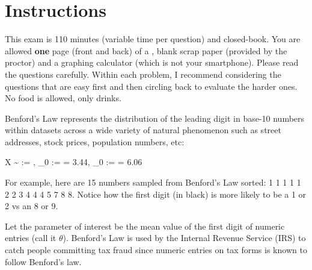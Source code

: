 \documentclass[12pt]{article}
\newcommand{\logbaseten}[1]{\text{log$_{10}$}\parens{#1}}
\begin{document}
\section*{Instructions}
This exam is 110 minutes (variable time per question) and closed-book. You are allowed \textbf{one} page (front and back) of a , blank scrap paper (provided by the proctor) and a graphing calculator (which is not your smartphone). Please read the questions carefully. Within each problem, I recommend considering the questions that are easy first and then circling back to evaluate the harder ones. No food is allowed, only drinks. %

\pagebreak

\problem Benford's Law represents the distribution of the leading digit in base-10 numbers within datasets across a wide variety of natural phenomenon such as street addresses, stock prices, population numbers, etc:

\beqn
X \sim {} := \logbaseten{\frac{x+1}{x}} , \quad \theta_0 :=  = 3.44, \quad \sigsq_0 :=  = 6.06
\eeqn

\noindent For example, here are 15 numbers sampled from Benford's Law sorted: 1 1 1 1 1 2 2 3 4 4 4 5 7 8 8. Notice how the first digit (in black) is more likely to be a 1 or 2 vs an 8 or 9.


Let the parameter of interest be the mean value of the first digit of numeric entries (call it $\theta$). Benford's Law is used by the Internal Revenue Service (IRS) to catch people committing tax fraud since numeric entries on tax forms is known to follow Benford's law. 



 
\end{document}
